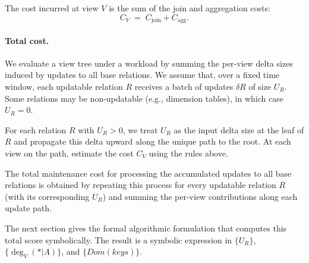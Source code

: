 \documentclass[11pt]{article}
\renewcommand{\deg}{\operatorname{deg}}
\begin{document}
The cost incurred at view $V$ is the sum of the join and aggregation costs:
\[
C_V \;=\; C_{\mathrm{join}} + C_{\mathrm{agg}}.
\]


\paragraph{Total cost.}
We evaluate a view tree under a workload by summing the per-view delta sizes induced by updates to all
base relations.
We assume that, over a fixed time window, each updatable relation $R$ receives a batch of updates $\delta R$
of size $U_R$. Some relations may be non-updatable (e.g., dimension tables), in which case $U_R=0$.

For each relation $R$ with $U_R>0$, we treat $U_R$ as the input delta size at the leaf of $R$ and propagate
this delta upward along the unique path to the root.
At each view on the path, estimate the cost $C_V$ using the rules above.

The total maintenance cost for processing the accumulated updates to all base relations is obtained by repeating this process for every updatable relation $R$ (with its corresponding $U_R$) and summing the per-view contributions along each update path.


The next section gives the formal algorithmic formulation that computes this total score symbolically.
The result is a symbolic expression in $\{U_R\}$, $\{\deg_V(*|A)\}$, and $\{Dom(keys)\}$.
\end{document}
